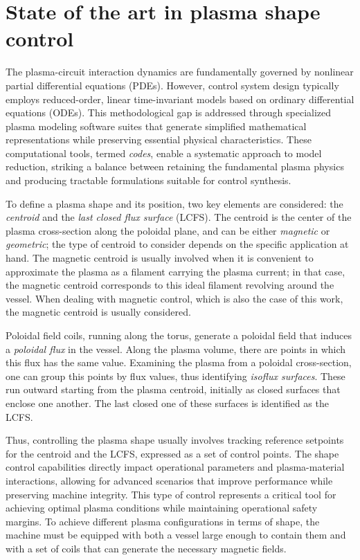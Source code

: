 \section{State of the art in plasma shape control}
\label{sec:sota_shapectrl}
The plasma-circuit interaction dynamics are fundamentally governed by nonlinear partial differential equations (PDEs). However, control system design typically employs reduced-order, linear time-invariant models based on ordinary differential equations (ODEs). This methodological gap is addressed through specialized plasma modeling software suites that generate simplified mathematical representations while preserving essential physical characteristics. These computational tools, termed \emph{codes}, enable a systematic approach to model reduction, striking a balance between retaining the fundamental plasma physics and producing tractable formulations suitable for control synthesis.

To define a plasma shape and its position, two key elements are considered: the \emph{centroid} and the \emph{last closed flux surface} (LCFS). The centroid is the center of the plasma cross-section along the poloidal plane, and can be either \emph{magnetic} or \emph{geometric}; the type of centroid to consider depends on the specific application at hand. The magnetic centroid is usually involved when it is convenient to approximate the plasma as a filament carrying the plasma current; in that case, the magnetic centroid corresponds to this ideal filament revolving around the vessel. When dealing with magnetic control, which is also the case of this work, the magnetic centroid is usually considered.

Poloidal field coils, running along the torus, generate a poloidal field that induces a \emph{poloidal flux} in the vessel. Along the plasma volume, there are points in which this flux has the same value. Examining the plasma from a poloidal cross-section, one can group this points by flux values, thus identifying \emph{isoflux surfaces}. These run outward starting from the plasma centroid, initially as closed surfaces that enclose one another. The last closed one of these surfaces is identified as the LCFS.

Thus, controlling the plasma shape usually involves tracking reference setpoints for the centroid and the LCFS, expressed as a set of control points. The shape control capabilities directly impact operational parameters and plasma-material interactions, allowing for advanced scenarios that improve performance while preserving machine integrity. This type of control represents a critical tool for achieving optimal plasma conditions while maintaining operational safety margins. To achieve different plasma configurations in terms of shape, the machine must be equipped with both a vessel large enough to contain them and with a set of coils that can generate the necessary magnetic fields.

